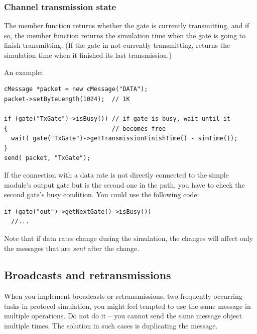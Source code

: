 \subsubsection{Channel transmission state}
\label{ch:simple-modules:cgate-transmission-state}

The  member function returns whether the gate
is currently transmitting, and if so, the
 member function
returns the simulation time when the gate is going to finish
transmitting. (If the gate in not currently transmitting,
 returns the simulation time
when it finished its last transmission.)

An example:

\begin{verbatim}
cMessage *packet = new cMessage("DATA");
packet->setByteLength(1024);  // 1K

if (gate("TxGate")->isBusy()) // if gate is busy, wait until it
{                             // becomes free
  wait( gate("TxGate")->getTransmissionFinishTime() - simTime());
}
send( packet, "TxGate");
\end{verbatim}

If the connection with a data rate is not directly connected
to the simple module's output gate but is the second
one in the path, you have to check the second gate's busy
condition. You could use the following
code:

\begin{verbatim}
if (gate("out")->getNextGate()->isBusy())
  //...
\end{verbatim}

Note that if data rates change during the
simulation, the changes will affect only the messages that are
\textit{sent} after the change.






\subsection{Broadcasts and retransmissions}

When you implement broadcasts or retransmissions, two frequently
occurring tasks in protocol simulation, you might feel tempted
to use the same message in multiple  operations.
Do not do it -- you cannot send the same message object multiple times.
The solution in such cases is duplicating the message.

